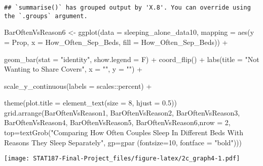 \documentclass[
]{article}
\newenvironment{Shaded}{\begin{snugshade}}{\end{snugshade}}
\newcommand{\AttributeTok}[1]{\textcolor[rgb]{0.77,0.63,0.00}{#1}}
\newcommand{\DecValTok}[1]{\textcolor[rgb]{0.00,0.00,0.81}{#1}}
\newcommand{\FloatTok}[1]{\textcolor[rgb]{0.00,0.00,0.81}{#1}}
\newcommand{\FunctionTok}[1]{\textcolor[rgb]{0.00,0.00,0.00}{#1}}
\newcommand{\NormalTok}[1]{#1}
\newcommand{\OtherTok}[1]{\textcolor[rgb]{0.56,0.35,0.01}{#1}}
\newcommand{\SpecialCharTok}[1]{\textcolor[rgb]{0.00,0.00,0.00}{#1}}
\newcommand{\StringTok}[1]{\textcolor[rgb]{0.31,0.60,0.02}{#1}}
\begin{document}
\begin{verbatim}
## `summarise()` has grouped output by 'X.8'. You can override using the `.groups` argument.
\end{verbatim}

\begin{Shaded}
\begin{Highlighting}[]
\NormalTok{BarOftenVsReason6 }\OtherTok{\textless{}{-}} \FunctionTok{ggplot}\NormalTok{(}\AttributeTok{data =}\NormalTok{ sleeping\_alone\_data10,}
                               \AttributeTok{mapping =} \FunctionTok{aes}\NormalTok{(}\AttributeTok{y =}\NormalTok{ Prop,}
                                             \AttributeTok{x =}\NormalTok{ How\_Often\_Sep\_Beds,}
                                             \AttributeTok{fill =}\NormalTok{ How\_Often\_Sep\_Beds)) }\SpecialCharTok{+}
  
  \FunctionTok{geom\_bar}\NormalTok{(}\AttributeTok{stat =} \StringTok{"identity"}\NormalTok{,}
           \AttributeTok{show.legend =}\NormalTok{ F) }\SpecialCharTok{+} 
  \FunctionTok{coord\_flip}\NormalTok{() }\SpecialCharTok{+} 
  \FunctionTok{labs}\NormalTok{(}\AttributeTok{title =} \StringTok{"Not Wanting to Share Covers"}\NormalTok{,}
       \AttributeTok{x =} \StringTok{""}\NormalTok{,}
       \AttributeTok{y =} \StringTok{""}\NormalTok{) }\SpecialCharTok{+}
  
  \FunctionTok{scale\_y\_continuous}\NormalTok{(}\AttributeTok{labels =}\NormalTok{ scales}\SpecialCharTok{::}\NormalTok{percent) }\SpecialCharTok{+}
  
  \FunctionTok{theme}\NormalTok{(}\AttributeTok{plot.title =} \FunctionTok{element\_text}\NormalTok{(}\AttributeTok{size =} \DecValTok{8}\NormalTok{, }\AttributeTok{hjust =} \FloatTok{0.5}\NormalTok{))}
\FunctionTok{grid.arrange}\NormalTok{(BarOftenVsReason1, BarOftenVsReason2, BarOftenVsReason3, BarOftenVsReason4, BarOftenVsReason5, BarOftenVsReason6,}\AttributeTok{nrow =} \DecValTok{2}\NormalTok{,}
             \AttributeTok{top=}\FunctionTok{textGrob}\NormalTok{(}\StringTok{"Comparing How Often Couples Sleep In Different Beds With Reasons They Sleep Separately"}\NormalTok{, }
             \AttributeTok{gp=}\FunctionTok{gpar}\NormalTok{ (}\AttributeTok{fontsize=}\DecValTok{10}\NormalTok{, }\AttributeTok{fontface =} \StringTok{"bold"}\NormalTok{)))}
\end{Highlighting}
\end{Shaded}

\texttt{[image: STAT187-Final-Project\_files/figure-latex/2c\_graph4-1.pdf]}
\end{document}

